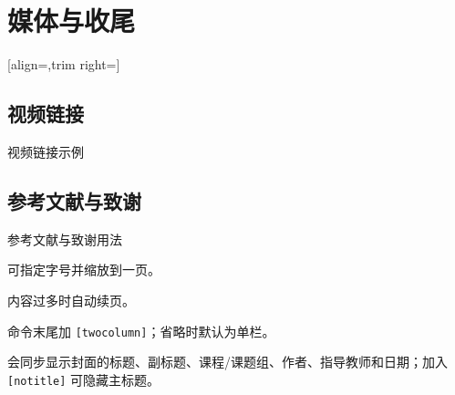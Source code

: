 \section{媒体与收尾}
[align=\campusexamplesectionalign,trim right=\campusexamplesectiontrim]
\subsection{视频链接}

\begin{frame}{视频链接示例}
      \centering
      \href{run:../assets/presentation_demo.mp4}{%
      }
\end{frame}

\subsection{参考文献与致谢}

\begin{frame}[fragile]{参考文献与致谢用法}
      \begin{description}[汇总单页]
            \item[汇总单页] \texttt{\string{}} 可指定字号并缩放到一页。
            \item[汇总续页] \texttt{\string{}} 内容过多时自动续页。
            \item[双栏汇总] 命令末尾加 \texttt{[twocolumn]}；省略时默认为单栏。
            \item[致谢页面] \texttt{\string\backmatter} 会同步显示封面的标题、副标题、课程/课题组、作者、指导教师和日期；加入 \texttt{[notitle]} 可隐藏主标题。
      \end{description}
\end{frame}

